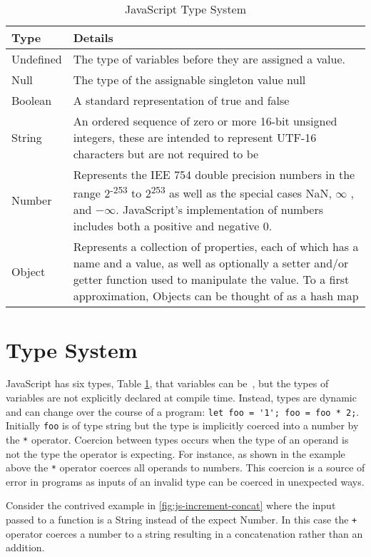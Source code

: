 \documentclass[]{final_report}
\begin{document}
\begin{table}[t]
\centering

\begin{tabular}{|p{2cm}|p{12cm}|}
\hline
Type & Details \\ \hline
Undefined & The type of variables before they are assigned a value. \\ \hline
Null & The type of the assignable singleton value null\\ \hline
Boolean & A standard representation of true and false \\ \hline
String & An ordered sequence of zero or more 16-bit unsigned integers, these are intended to represent UTF-16 characters but are not required to be \\ \hline
Number & Represents the IEE 754 double precision numbers in the range 2\textsuperscript{-253} to 2\textsuperscript{253} as well as the special cases NaN, $\infty$ , and $ -\infty$. JavaScript's implementation of numbers includes both a positive and negative 0. \\ \hline
Object & Represents a collection of properties, each of which has a name and a value, as well as optionally a setter and/or getter function used to manipulate the value. To a first approximation, Objects can be thought of as a hash map \\ \hline
\end{tabular}
\caption{JavaScript Type System}
\label{type-system}
\end{table}

\section{Type System}
JavaScript has six types, Table \ref{type-system}, that variables can be~\cite{EcmaScript}, but the types of variables are not explicitly declared at compile time. Instead, types are dynamic and can change over the course of a program: \lstinline{let foo = '1'; foo = foo * 2;}. Initially \lstinline{foo} is of type string but the type is implicitly coerced into a number by the \lstinline{*} operator. Coercion between types occurs when the type of an operand is not the type the operator is expecting. For instance, as shown in the example above the \lstinline{*} operator coerces all operands to numbers. This coercion is a source of error in programs as inputs of an invalid type can be coerced in unexpected ways.

Consider the contrived example in \ref{fig:js-increment-concat} where the input passed to a function is a String instead of the expect Number. In this case the \lstinline{+} operator coerces a number to a string resulting in a concatenation rather than an addition.
\end{document}
